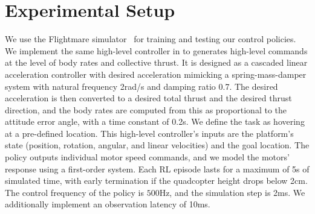 \section{Experimental Setup}

 We use the Flightmare simulator~\cite{song2020flightmare} for training and testing our control policies. 
We implement the same high-level controller in \cite{mueller2018multicopter} to generates high-level commands at the level of body rates and collective thrust.
It is designed as a cascaded linear acceleration controller with desired acceleration mimicking a spring-mass-damper system with natural frequency 2rad/s and damping ratio 0.7. The desired acceleration is then converted to a desired total thrust and the desired thrust direction, and the body rates are computed from this as proportional to the attitude error angle, with a time constant of 0.2s.
%
We define the task as hovering at a pre-defined location.
%
This high-level controller's inputs are the platform's state (position, rotation, angular, and linear velocities) and the goal location. 
%
The policy outputs individual motor speed commands, and we model the motors' response using a first-order system.
%
Each RL episode lasts for a maximum of 5s of simulated time, with early termination if the quadcopter height drops below 2cm.
%
The control frequency of the policy is $500$Hz, and the simulation step is 2ms.
%
We additionally implement an observation latency of 10ms.

